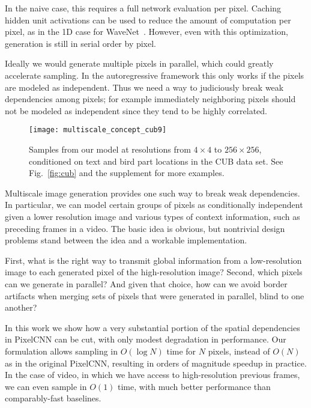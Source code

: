 \documentclass{article}
\begin{document}
In the naive case, this requires a full network evaluation per pixel.
Caching hidden unit activations can be used to reduce the amount of computation per pixel, as in the 1D case for WaveNet~\cite{oord2016wavenet,ramachandran2017fastgeneration}.
However, even with this optimization, generation is still in serial order by pixel.


Ideally we would generate multiple pixels in parallel, which could greatly accelerate sampling.
In the autoregressive framework this only works if the pixels are modeled as independent.
Thus we need a way to judiciously break weak dependencies among pixels; for example immediately neighboring pixels should not be modeled as independent since they tend to be highly correlated.







\begin{figure}[t!]
\texttt{[image: multiscale\_concept\_cub9]}\vspace{-0.15in}
\caption{Samples from our model at resolutions from $4 \times 4$ to $256 \times 256$, conditioned on text and bird part locations in the CUB data set. See Fig.~\ref{fig:cub} and the supplement for more examples.}
\label{fig:concept}
\vspace{-0.1in}
\end{figure}

Multiscale image generation provides one such way to break weak dependencies.
In particular, we can model certain groups of pixels as conditionally independent given a lower resolution image and various types of context information, such as preceding frames in a video.
The basic idea is obvious, but nontrivial design problems stand between the idea and a workable implementation.

First, what is the right way to transmit global information from a low-resolution image to each generated pixel of the high-resolution image?
Second, which pixels can we generate in parallel? And given that choice, how can we avoid border artifacts when merging sets of pixels that were generated in parallel, blind to one another?

In this work we show how a very substantial portion of the spatial dependencies in PixelCNN can be cut, with only modest degradation in performance.
Our formulation allows sampling in $O(\log N)$ time for $N$ pixels, instead of $O(N)$ as in the original PixelCNN, resulting in orders of magnitude speedup in practice. In the case of video, in which we have access to high-resolution previous frames, we can even sample in $O(1)$ time, with much better performance than comparably-fast baselines.
\end{document}
